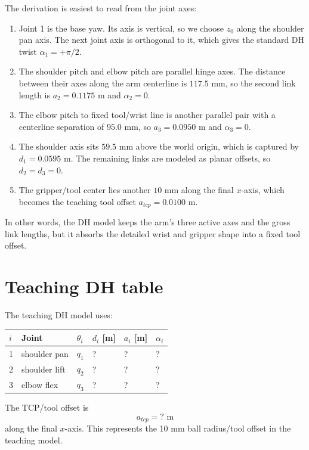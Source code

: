 \documentclass[11pt]{article}
\begin{document}
The derivation is easiest to read from the joint axes:
\begin{enumerate}[leftmargin=1.3em]
  \item Joint 1 is the base yaw. Its axis is vertical, so we choose \(z_0\)
        along the shoulder pan axis. The next joint axis is orthogonal to it,
        which gives the standard DH twist \(\alpha_1 = +\pi/2\).
  \item The shoulder pitch and elbow pitch are parallel hinge axes. The
        distance between their axes along the arm centerline is \(117.5\) mm,
        so the second link length is \(a_2 = 0.1175\) m and \(\alpha_2 = 0\).
  \item The elbow pitch to fixed tool/wrist line is another parallel pair with
        a centerline separation of \(95.0\) mm, so \(a_3 = 0.0950\) m and
        \(\alpha_3 = 0\).
  \item The shoulder axis sits \(59.5\) mm above the world origin, which is
        captured by \(d_1 = 0.0595\) m. The remaining links are modeled as
        planar offsets, so \(d_2 = d_3 = 0\).
  \item The gripper/tool center lies another \(10\) mm along the final
        \(x\)-axis, which becomes the teaching tool offset \(a_{tcp}=0.0100\)
        m.
\end{enumerate}

In other words, the DH model keeps the arm's three active axes and the gross
link lengths, but it absorbs the detailed wrist and gripper shape into a fixed
tool offset.

\section{Teaching DH table}
The teaching DH model uses:
\begin{center}
\begin{tabular}{@{}llllll@{}}
\toprule
\(i\) & Joint & \(\theta_i\) & \(d_i\) [m] & \(a_i\) [m] & \(\alpha_i\) \\
\midrule
1 & shoulder pan & \(q_1\) & ? & ? & ? \\
2 & shoulder lift & \(q_2\) & ? & ? & ? \\
3 & elbow flex & \(q_3\) & ? & ? & ? \\
\bottomrule
\end{tabular}
\end{center}

The TCP/tool offset is
\[
a_{tcp} = ? \text{ m}
\]
along the final \(x\)-axis. This represents the 10 mm ball radius/tool offset in
the teaching model.
\end{document}
